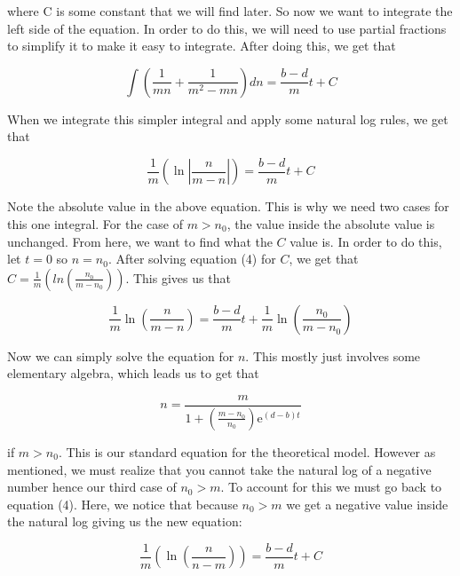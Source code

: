 \documentclass{article}\usepackage[]{graphicx}\usepackage[]{color}
\begin{document}
\noindent where C is some constant that we will find later. So now we want to integrate the left side of the equation. In order to do this, we will need to use partial fractions to simplify it to make it easy to integrate. After doing this, we get that 

\begin{equation}
\int\left(\frac{1}{mn}+\frac{1}{m^2-mn}\right)dn = \frac{b-d}{m} t + C
\end{equation}

\noindent When we integrate this simpler integral and apply some natural log rules, we get that 

\begin{equation}
\frac{1}{m}\left(\ln\left|\frac{n}{m-n}\right|\right) = \frac{b-d}{m} t + C
\end{equation}

\noindent Note the absolute value in the above equation. This is why we need two cases for this one integral. For the case of \(m > n_0\), the value inside the absolute value is unchanged. From here, we want to find what the \(C\) value is. In order to do this, let \(t=0\) so \(n=n_0\). After solving equation (4) for \(C\), we get that \(C = \frac{1}{m}(ln(\frac{n_0}{m-n_0}))\). This gives us that 

\begin{equation}
\frac{1}{m} \ln\left(\frac{n}{m-n}\right) = \frac{b-d}{m}t + \frac{1}{m}\ln\left(\frac{n_0}{m-n_0}\right)
\end{equation}

\noindent Now we can simply solve the equation for \(n\). This mostly just involves some elementary algebra, which leads us to get that 

\begin{equation}
n = \frac{m}{1+\left(\frac{m-n_0}{n_0}\right)\mathrm{e}^{(d-b)t}}
\end{equation}

\noindent if \(m > n_0\). This is our standard equation for the theoretical model. However as mentioned, we must realize that you cannot take the natural log of a negative number hence our third case of \(n_0 >m\). To account for this we must go back to equation (4). Here, we notice that because \(n_0 > m\) we get a negative value inside the natural log giving us the new equation:

\begin{equation}
\frac{1}{m}\left(\ln\left(\frac{n}{n-m}\right)\right) = \frac{b-d}{m} t + C
\end{equation}
\end{document}
